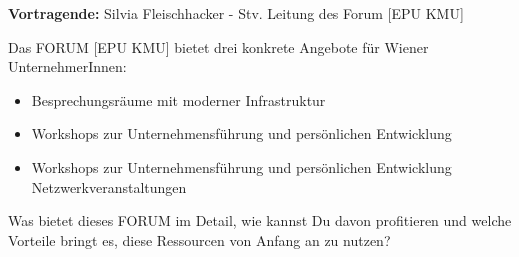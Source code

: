 \textbf{Vortragende:} Silvia Fleischhacker  - Stv. Leitung des Forum [EPU KMU]


Das FORUM [EPU KMU] bietet drei konkrete Angebote für Wiener UnternehmerInnen:
\begin{itemize}
	\item Besprechungsräume mit moderner Infrastruktur
	\item Workshops zur Unternehmensführung und persönlichen Entwicklung
	\item Workshops zur Unternehmensführung und persönlichen Entwicklung
	Netzwerkveranstaltungen 
\end{itemize}

Was bietet dieses FORUM im Detail, wie kannst Du davon profitieren und welche Vorteile bringt es, diese Ressourcen von Anfang an zu nutzen?

\subsection{}







